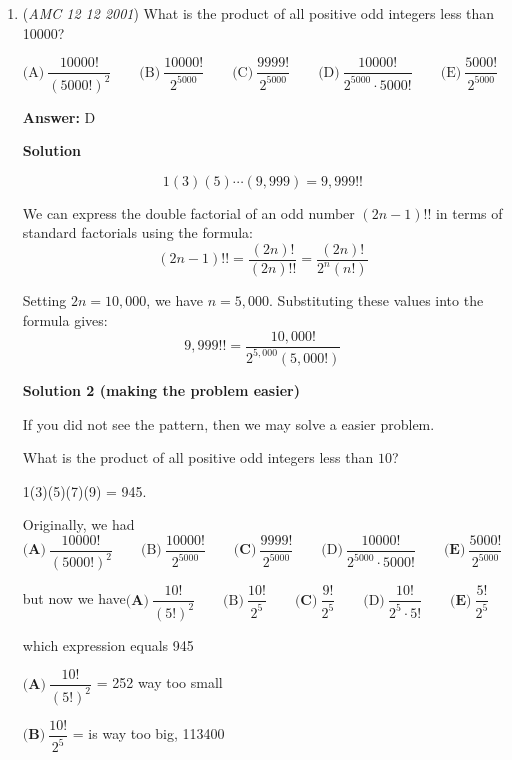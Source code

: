 \begin{enumerate}
 \[x - 2z + 50 = 2x - 4z + 100\] 

 when solve the above obtained equation and $z - 2x - 25 = 0$ we obtain the values of $z = 25$ and $x = 0$

 Therefore the sum of the three numbers is $25 + 5 + 0 = \boxed{\textbf{(D) }30}$



	\item (\textit{AMC 12 12 2001}) What is the product of all positive odd integers less than 10000?


 $\text{(A)}\ \dfrac{10000!}{(5000!)^2}\qquad \text{(B)}\ \dfrac{10000!}{2^{5000}}\qquad \text{(C)}\ \dfrac{9999!}{2^{5000}}\qquad \text{(D)}\ \dfrac{10000!}{2^{5000} \cdot 5000!}\qquad \text{(E)}\ \dfrac{5000!}{2^{5000}}$

 \textbf{Answer: }D



\textbf{Solution}


 \[1(3)(5) \cdots (9,999) = 9,999!!\]

 We can express the double factorial of an odd number $(2n-1)!!$ in terms of standard factorials using the formula:
 \[(2n-1)!! = \frac{(2n)!}{(2n)!!} = \frac{(2n)!}{2^n(n!)}\]

 Setting $2n = 10,000$, we have $n = 5,000$. Substituting these values into the formula gives:
 \[9,999!! = \frac{10,000!}{2^{5,000}(5,000!)}\]




\textbf{Solution 2 (making the problem easier)}

If you did not see the pattern, then we may solve a easier problem.

 What is the product of all positive odd integers less than $10$?

 1(3)(5)(7)(9) = 945.

 Originally, we had$\textbf{(A)}\ \dfrac{10000!}{(5000!)^2}\qquad \text{(B)}\ \dfrac{10000!}{2^{5000}}\qquad \textbf{(C)}\ \dfrac{9999!}{2^{5000}}\qquad \text{(D)}\ \dfrac{10000!}{2^{5000} \cdot 5000!}\qquad \textbf{(E)}\ \dfrac{5000!}{2^{5000}}$

 but now we have$\textbf{(A)}\ \dfrac{10!}{(5!)^2}\qquad \text{(B)}\ \dfrac{10!}{2^{5}}\qquad \textbf{(C)}\ \dfrac{9!}{2^{5}}\qquad \text{(D)}\ \dfrac{10!}{2^{5} \cdot 5!}\qquad \textbf{(E)}\ \dfrac{5!}{2^{5}}$

 which expression equals 945 

 $\textbf{(A)}\ \dfrac{10!}{(5!)^2}$ = 252 way too small 

 $\textbf{(B)}\ \dfrac{10!}{2^{5}}$ = is way too big, 113400


\end{enumerate}

